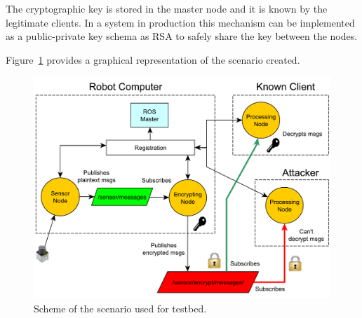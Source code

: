 \documentclass[journal,twoside]{JoPhA}
\begin{document}


The cryptographic key  is stored in the master node and it is known by the legitimate clients. In a system in production this mechanism can be implemented as a public-private key schema as RSA  to safely share the key between the nodes. 

Figure~\ref{fig:TestBed} provides a graphical representation of the scenario created.


\begin{figure}[ht]
    \centering
    \includegraphics[width=.5\textwidth]{TestBed_complete.pdf}
    \caption{Scheme of the scenario used for testbed.}
  \label{fig:TestBed}
\end{figure}


\end{document}
